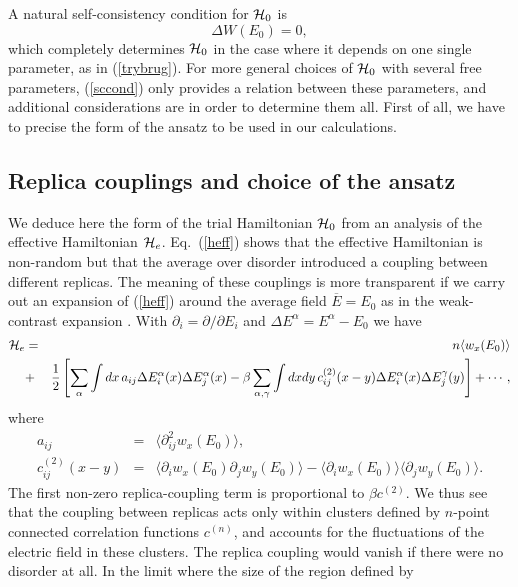 A natural self-consistency condition for ${\cal{H}}_0$
is
\begin{equation}
\label{sccond}
\Delta W(E_0)=0,
\end{equation}
which completely determines ${\cal{H}}_0$ in the case where it
depends on one single parameter, as in (\ref{trybrug}). For more general
choices of ${\cal{H}}_0$ with several free parameters, (\ref{sccond})
only provides a relation between these parameters, and additional
considerations are in order to determine them all. First of all,
we have to precise the form of the ansatz to be used in our calculations.

\subsection{Replica couplings and choice of the ansatz}
\label{rcacota}
We deduce here the form of the trial Hamiltonian ${\cal{H}}_0$ from an
analysis of the effective Hamiltonian ${\cal{H}}_e$. Eq.\ (\ref{heff})
shows that the effective Hamiltonian is non-random but that the
average over disorder introduced a coupling between different
replicas. The meaning of these couplings is more transparent if we
carry out an expansion of (\ref{heff}) around the average field
$\overline{E}=E_0$ as in the weak-contrast expansion \cite{BART98}.
With $\partial_i=\partial/\partial E_i$ and $\Delta
E^\alpha=E^\alpha-E_0$ we have
\begin{eqnarray}
{\cal{H}}_e&=&n\langle w_x(E_0)\rangle\nonumber\\
&+&\frac{1}{2}
\left[ \sum_{\alpha}\int dx\,a_{ij}\Delta E^\alpha_i(x) \Delta E^\alpha_j(x)-\beta\sum_{\alpha,\gamma} \int dx dy\, c^{(2)}_{ij}(x-y)\Delta E^\alpha_i(x) \Delta E^\gamma_j(y)\right] +\cdots,
\end{eqnarray}
where
\begin{eqnarray}
\label{aa}
a_{ij}&=&\langle \partial^2_{ij} w_x(E_0)\rangle,\\
\label{bb}
c^{(2)}_{ij}(x-y)&=&\langle\partial_{i} w_x(E_0)\partial_{j} w_y(E_0)
\rangle-\langle \partial_{i} w_x(E_0)\rangle\langle\partial_{j}
w_y(E_0)\rangle.
\end{eqnarray}
The first non-zero replica-coupling term is proportional to $\beta
c^{(2)}$. We thus see that the coupling between replicas acts only
within clusters defined by $n$-point connected correlation functions
$c^{(n)}$, and accounts for the fluctuations of the electric field in
these clusters. The replica coupling would vanish if there were no
disorder at all. In the limit where the size of the region defined by
